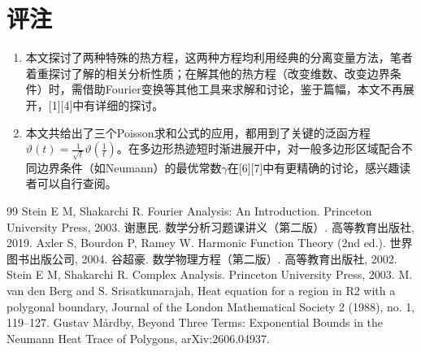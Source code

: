 \documentclass[UTF8,zihao=5,linespread=1.34]{ctexart}
\theoremstyle{cnplain}
\theoremstyle{cnremark}
\begin{document}
\newpage
\section*{评注}

\begin{enumerate}
\item 本文探讨了两种特殊的热方程，这两种方程均利用经典的分离变量方法，笔者着重探讨了解的相关分析性质；在解其他的热方程（改变维数、改变边界条件）时，需借助Fourier变换等其他工具来求解和讨论，鉴于篇幅，本文不再展开，[1][4]中有详细的探讨。

\item 本文共给出了三个Poisson求和公式的应用，都用到了关键的泛函方程$\vartheta(t) = \frac{1}{\sqrt{t}}\vartheta(\frac{1}{t})$。在多边形热迹短时渐进展开中，对一般多边形区域配合不同边界条件（如Neumann）的最优常数$\gamma$在[6][7]中有更精确的讨论，感兴趣读者可以自行查阅。
\end{enumerate}

\begin{thebibliography}{99}
 Stein E M, Shakarchi R. Fourier Analysis: An Introduction. Princeton University Press, 2003.
 谢惠民. 数学分析习题课讲义（第二版）. 高等教育出版社, 2019.
 Axler S, Bourdon P, Ramey W. Harmonic Function Theory (2nd ed.). 世界图书出版公司, 2004.
 谷超豪. 数学物理方程（第二版）. 高等教育出版社, 2002.
 Stein E M, Shakarchi R. Complex Analysis. Princeton University Press, 2003.
 M. van den Berg and S. Srisatkunarajah, Heat equation for a region in R2 with a polygonal boundary, Journal of the London Mathematical Society 2 (1988), no. 1, 119--127.
 Gustav Mårdby, Beyond Three Terms: Exponential Bounds in the Neumann Heat Trace of Polygons, arXiv:2606.04937.
\end{thebibliography}
\end{document}
